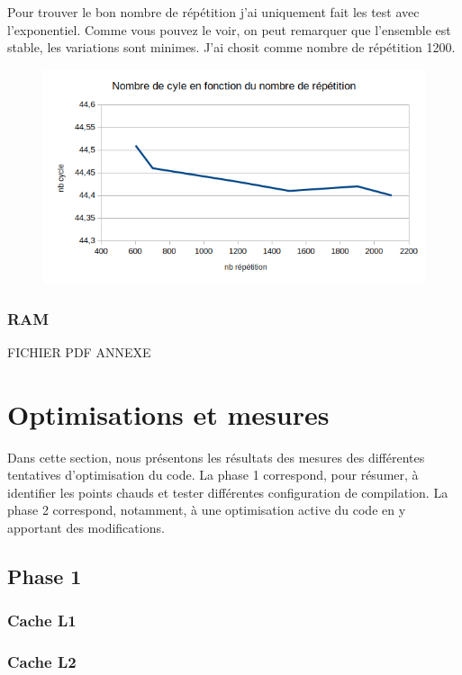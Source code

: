 \documentclass[12pt,a4paper]{article}
\begin{document}
Pour trouver le bon nombre de répétition j'ai uniquement fait les test avec
l'exponentiel. Comme vous pouvez le voir, on peut remarquer que l'ensemble est
stable, les variations sont minimes. J'ai chosit comme nombre de répétition
1200.
\begin{figure}[h]
    \includegraphics[scale=0.8]{figures/L2/L2repet.png}
    \caption{ }
\end{figure}

\subsubsection{RAM}

FICHIER PDF ANNEXE

\section{Optimisations et mesures}

Dans cette section, nous présentons les résultats des mesures des différentes
tentatives d'optimisation du code. La phase 1 correspond, pour résumer, à
identifier les points chauds et tester différentes configuration de compilation.
La phase 2 correspond, notamment, à une optimisation active du code en y apportant
des modifications.

\subsection{Phase 1}

\subsubsection{Cache L1}

\subsubsection{Cache L2}
\end{document}
